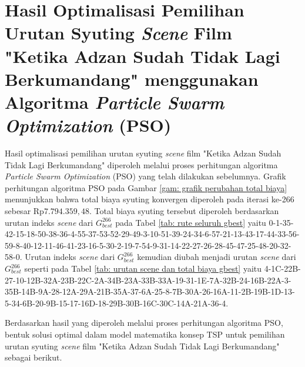 \section{Hasil Optimalisasi Pemilihan Urutan Syuting \textit{Scene}  Film "Ketika Adzan Sudah Tidak Lagi Berkumandang" menggunakan Algoritma \textit{Particle Swarm Optimization} (PSO)}
\vspace{-4mm}
{\frenchspacing
    Hasil optimalisasi pemilihan urutan syuting \textit{scene}  film "Ketika Adzan Sudah Tidak Lagi Berkumandang" diperoleh melalui proses perhitungan algoritma \textit{Particle Swarm Optimization} (PSO) yang telah dilakukan sebelumnya.
    Grafik perhitungan algoritma PSO pada Gambar \ref{gam: grafik perubahan total biaya} menunjukkan bahwa total biaya syuting konvergen diperoleh pada iterasi ke-266 sebesar Rp$7.794.359,48$.
    Total biaya syuting tersebut diperoleh berdasarkan urutan indeks \textit{scene} dari $G_{best}^{266}$ pada Tabel \ref{tab: rute seluruh gbest} yaitu
    0-1-35-42-15-18-50-38-36-4-55-37-53-52-29-49-3-10-51-39-24-34-6-57-21-13-43-17-44-33-56-59-8-40-12-11-46-41-23-16-5-30-2-19-7-54-9-31-14-22-27-26-28-45-47-25-48-20-32-58-0.
    Urutan indeks \textit{scene} dari $G_{best}^{266}$ kemudian diubah menjadi urutan \textit{scene} dari $G_{best}^{266}$ seperti pada Tabel \ref{tab: urutan scene dan total biaya gbest} yaitu
    4-1C-22B-27-10-12B-32A-23B-22C-2A-34B-23A-33B-33A-19-31-1E-7A-32B-24-16B-22A-3-35B-14B-9A-28-12A-29A-21B-35A-37-6A-25-8-7B-30A-26-16A-11-2B-19B-1D-13-5-34-6B-20-9B-15-17-16D-18-29B-30B-16C-30C-14A-21A-36-4.

    Berdasarkan hasil yang diperoleh melalui proses perhitungan algoritma PSO, bentuk solusi optimal dalam model matematika konsep TSP untuk pemilihan urutan syuting \textit{scene}  film "Ketika Adzan Sudah Tidak Lagi Berkumandang" sebagai berikut.

}
